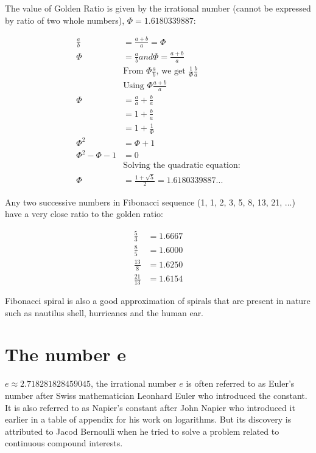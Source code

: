 \documentclass[12pt, UTF8]{article}
\begin{document}
	The value of Golden Ratio is given by the irrational number (cannot be expressed by ratio of two whole numbers), $\Phi = 1.6180339887$:
	
	\begin{align}
		\frac{a}{b} &= \frac{a + b}{a} = \Phi  \nonumber \\
		\Phi &= \frac{a}{b} and \Phi = \frac{a+b}{a}  \nonumber \\
		&\text{From $\Phi \frac{a}{b}$, we get $\frac{1}{\Phi} \frac{b}{a}$}  \nonumber \\
		&\text{Using $\Phi \frac{a+b}{a}$}  \nonumber \\
		\Phi &= \frac{a}{a} + \frac{b}{a}  \nonumber \\
		&= 1 + \frac{b}{a}  \nonumber \\
		&= 1 + \frac{1}{\Phi}  \nonumber \\
		\Phi^{2} &= \Phi + 1  \nonumber \\
		\Phi^{2} - \Phi -1 &= 0  \nonumber \\
		&\text{Solving the quadratic equation:}  \nonumber \\
		\Phi &= \frac{1 + \sqrt{5}}{2} = 1.6180339887... 
	\end{align}
	
	Any two successive numbers in Fibonacci sequence (1, 1, 2, 3, 5, 8, 13, 21, ...) have a very close ratio to the golden ratio:
	
	\begin{align}
		\frac{5}{3} &= 1.6667  \nonumber \\
		\frac{8}{5} &= 1.6000  \nonumber \\
		\frac{13}{8} &= 1.6250  \nonumber \\
		\frac{21}{13} &= 1.6154  \nonumber 
	\end{align}
	
	Fibonacci spiral is also a good approximation of spirals that are present in nature such as nautilus shell, hurricanes and the human ear.
	
	\section{The number e}
	
	$e \approx 2.718281828459045$, the irrational number $e$ is often referred to as Euler's number after Swiss mathematician Leonhard Euler who introduced the constant. It is also referred to as Napier's constant after John Napier who introduced it earlier in a table of appendix for his work on logarithms. But its discovery is attributed to Jacod Bernoulli when he tried to solve a problem related to continuous compound interests.
	
\end{document}
